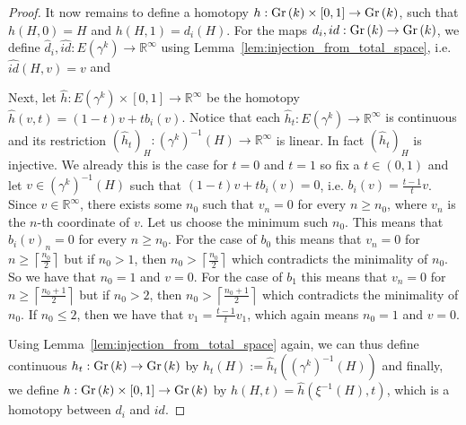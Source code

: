 \begin{proof}
It now remains to define a homotopy $h:\Gr{k}\times[0,1]\to\Gr{k}$, such that $h(H,0)=H$ and $h(H,1)=d_i(H)$. For the maps $d_i,id:\Gr{k}\to\Gr{k}$, we define $\hat{d}_i,\hat{id}:E(\gamma^k)\to \mathbb{R}^{\infty}$ using Lemma~\ref{lem:injection_from_total_space}, i.e. $\hat{id}(H,v)=v$ and
\begin{center}
\end{center}
Next, let $\hat{h}:E(\gamma^k)\times[0,1]\to\mathbb{R}^{\infty}$ be the homotopy $\hat{h}(v,t)=(1-t)v+tb_i(v)$. Notice that each $\hat{h}_t:E(\gamma^k)\to\mathbb{R}^{\infty}$ is continuous and its restriction $(\hat{h}_t)_H:(\gamma^k)^{-1}(H)\to\mathbb{R}^{\infty}$ is linear. In fact $(\hat{h}_t)_H$ is injective. We already this is the case for $t=0$ and $t=1$ so fix a $t\in(0,1)$ and let $v\in(\gamma^k)^{-1}(H)$ such that $(1-t)v+tb_i(v)=0$, i.e. $b_i(v)=\frac{t-1}{t}v$. Since $v\in\mathbb{R}^{\infty}$, there exists some $n_0$ such that $v_n=0$ for every $n\geq n_0$, where $v_n$ is the $n$-th coordinate of $v$. Let us choose the minimum such $n_0$. This means that $b_i(v)_n=0$ for every $n\geq n_0$. For the case of $b_0$ this means that $v_n=0$ for $n\geq\left\lceil\frac{n_0}{2}\right\rceil$ but if $n_0>1$, then $n_0>\left\lceil\frac{n_0}{2}\right\rceil$ which contradicts the minimality of $n_0$. So we have that $n_0=1$ and $v=0$. For the case of $b_1$ this means that $v_n=0$ for $n\geq\left\lceil\frac{n_0+1}{2}\right\rceil$ but if $n_0>2$, then $n_0>\left\lceil\frac{n_0+1}{2}\right\rceil$ which contradicts the minimality of $n_0$. If $n_0\leq2$, then we have that $v_1=\frac{t-1}{t}v_1$, which again means $n_0=1$ and $v=0$.

Using Lemma~\ref{lem:injection_from_total_space} again, we can thus define continuous $h_t:\Gr{k}\to\Gr{k}$ by $h_t(H):=\hat{h}_t((\gamma^k)^{-1}(H))$ and finally, we define $h:\Gr{k}\times[0,1]\to\Gr{k}$ by $h(H,t)=\hat{h}(\xi^{-1}(H),t)$, which is a homotopy between $d_i$ and $id$.
\end{proof}


